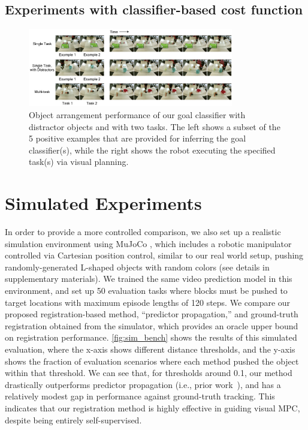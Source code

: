 \subsection{Experiments with classifier-based cost function}
\begin{figure}
	\centering
	\includegraphics[width=0.8\textwidth]{images_cls/cls_results.jpeg}
	\caption{\small Object arrangement performance of our goal classifier with distractor objects and with two tasks. The left shows a subset of the 5 positive examples that are provided for inferring the goal classifier(s), while the right shows the robot executing the specified task(s) via visual planning. }
	\label{fig:cls_results}
	\vspace{-0.3cm}
\end{figure}

\section{Simulated Experiments}

In order to provide a more controlled comparison, we also set up a realistic simulation environment using MuJoCo \cite{todorov2012mujoco}, which includes a robotic manipulator controlled via Cartesian position control, similar to our real world setup, pushing randomly-generated L-shaped objects with random colors (see details in supplementary materials). 
We trained the same video prediction model in this environment, and set up 50 evaluation tasks where blocks must be pushed to target locations with maximum episode lengths of 120 steps. 
We  compare our proposed registration-based method, ``predictor propagation,'' and ground-truth registration obtained from the simulator, which provides an oracle upper bound on registration performance. \autoref{fig:sim_bench} shows the results of this simulated evaluation, where the x-axis shows different distance thresholds, and the y-axis shows the fraction of evaluation scenarios where each method pushed the object within that threshold. We can see that, for thresholds around 0.1, our method drastically outperforms predictor propagation (i.e., prior work~\cite{sna}), and has a relatively modest gap in performance against ground-truth tracking. This indicates that our registration method is highly effective in guiding visual MPC, despite being entirely self-supervised.




